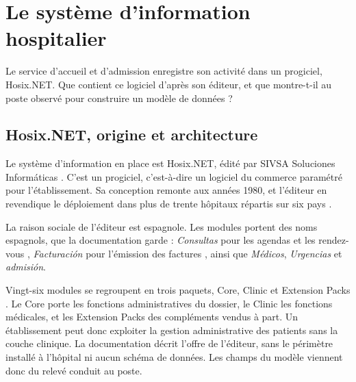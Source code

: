 
\chapter{Le système d'information hospitalier}\label{chap:systeme}

Le service d'accueil et d'admission enregistre son activité dans un progiciel, Hosix.NET. Que
contient ce logiciel d'après son éditeur, et que montre-t-il au poste observé pour construire un
modèle de données ?

\section{Hosix.NET, origine et architecture}

Le système d'information en place est Hosix.NET, édité par SIVSA Soluciones Informáticas
\cite{s06}. C'est un progiciel, c'est-à-dire un logiciel du commerce paramétré pour
l'établissement. Sa conception remonte aux années 1980, et l'éditeur en revendique le déploiement
dans plus de trente hôpitaux répartis sur six pays \cite{s07}.

La raison sociale de l'éditeur est espagnole. Les modules portent des noms espagnols, que la
documentation garde : \emph{Consultas} pour les agendas et les rendez-vous \cite{s08},
\emph{Facturación} pour l'émission des factures \cite{s09}, ainsi que \emph{Médicos},
\emph{Urgencias} et \emph{admisión}.

Vingt-six modules se regroupent en trois paquets, Core, Clinic et Extension Packs \cite{s06}. Le
Core porte les fonctions administratives du dossier, le Clinic les fonctions médicales, et les
Extension Packs des compléments vendus à part. Un établissement peut donc exploiter la gestion
administrative des patients sans la couche clinique. La documentation décrit l'offre de l'éditeur,
sans le périmètre installé à l'hôpital ni aucun schéma de données. Les champs du modèle viennent donc
du relevé conduit au poste.

